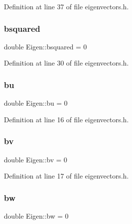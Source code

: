Definition at line 37 of file eigenvectors.\+h.

\mbox{\label{classEigen_a5fa9487346d50a62fcd973ce397372a5}} 
\subsubsection{\texorpdfstring{bsquared}{bsquared}}
{\footnotesize\ttfamily double Eigen\+::bsquared = 0\hspace{0.3cm}{\ttfamily [private]}}



Definition at line 30 of file eigenvectors.\+h.

\mbox{\label{classEigen_aed2cd8dc2daaf33f52d009386a091096}} 
\subsubsection{\texorpdfstring{bu}{bu}}
{\footnotesize\ttfamily double Eigen\+::bu = 0\hspace{0.3cm}{\ttfamily [private]}}



Definition at line 16 of file eigenvectors.\+h.

\mbox{\label{classEigen_a72a8c197fecfdd434b5c2863a00e3ba0}} 
\subsubsection{\texorpdfstring{bv}{bv}}
{\footnotesize\ttfamily double Eigen\+::bv = 0\hspace{0.3cm}{\ttfamily [private]}}



Definition at line 17 of file eigenvectors.\+h.

\mbox{\label{classEigen_ada874d67f24ad446fcb5f9c797d39b63}} 
\subsubsection{\texorpdfstring{bw}{bw}}
{\footnotesize\ttfamily double Eigen\+::bw = 0\hspace{0.3cm}{\ttfamily [private]}}



